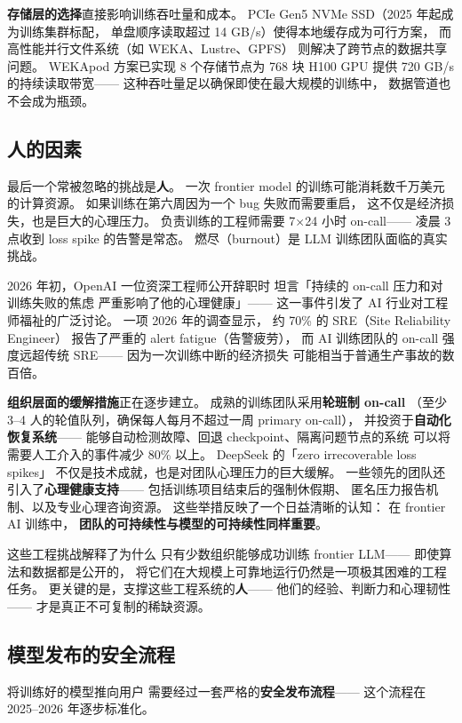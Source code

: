 \textbf{存储层的选择}直接影响训练吞吐量和成本。
PCIe Gen5 NVMe SSD（2025 年起成为训练集群标配，
单盘顺序读取超过 14 GB/s）使得本地缓存成为可行方案，
而高性能并行文件系统（如 WEKA、Lustre、GPFS）
则解决了跨节点的数据共享问题。
WEKApod 方案已实现 8 个存储节点为 768 块 H100 GPU
提供 720 GB/s 的持续读取带宽——
这种吞吐量足以确保即使在最大规模的训练中，
数据管道也不会成为瓶颈。

\subsection{人的因素}

最后一个常被忽略的挑战是\textbf{人}。
一次 frontier model 的训练可能消耗数千万美元的计算资源。
如果训练在第六周因为一个 bug 失败而需要重启，
这不仅是经济损失，也是巨大的心理压力。
负责训练的工程师需要 7$\times$24 小时 on-call——
凌晨 3 点收到 loss spike 的告警是常态。
燃尽（burnout）是 LLM 训练团队面临的真实挑战。

2026 年初，OpenAI 一位资深工程师公开辞职时
坦言「持续的 on-call 压力和对训练失败的焦虑
严重影响了他的心理健康」——
这一事件引发了 AI 行业对工程师福祉的广泛讨论。
一项 2026 年的调查显示，
约 70\% 的 SRE（Site Reliability Engineer）
报告了严重的 alert fatigue（告警疲劳），
而 AI 训练团队的 on-call 强度远超传统 SRE——
因为一次训练中断的经济损失
可能相当于普通生产事故的数百倍。

\textbf{组织层面的缓解措施}正在逐步建立。
成熟的训练团队采用\textbf{轮班制 on-call}
（至少 3--4 人的轮值队列，确保每人每月不超过一周 primary on-call），
并投资于\textbf{自动化恢复系统}——
能够自动检测故障、回退 checkpoint、隔离问题节点的系统
可以将需要人工介入的事件减少 80\% 以上。
DeepSeek 的「zero irrecoverable loss spikes」
不仅是技术成就，也是对团队心理压力的巨大缓解。
一些领先的团队还引入了\textbf{心理健康支持}——
包括训练项目结束后的强制休假期、
匿名压力报告机制、以及专业心理咨询资源。
这些举措反映了一个日益清晰的认知：
在 frontier AI 训练中，
\textbf{团队的可持续性与模型的可持续性同样重要}。

这些工程挑战解释了为什么
只有少数组织能够成功训练 frontier LLM——
即使算法和数据都是公开的，
将它们在大规模上可靠地运行仍然是一项极其困难的工程任务。
更关键的是，支撑这些工程系统的\textbf{人}——
他们的经验、判断力和心理韧性——
才是真正不可复制的稀缺资源。

\subsection{模型发布的安全流程}

将训练好的模型推向用户
需要经过一套严格的\textbf{安全发布流程}——
这个流程在 2025--2026 年逐步标准化。

